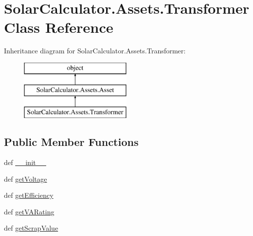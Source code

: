 \hypertarget{class_solar_calculator_1_1_assets_1_1_transformer}{\section{Solar\-Calculator.\-Assets.\-Transformer Class Reference}
\label{class_solar_calculator_1_1_assets_1_1_transformer}
}
Inheritance diagram for Solar\-Calculator.\-Assets.\-Transformer\-:\begin{figure}[H]
\begin{center}
\leavevmode
\includegraphics[height=3.000000cm]{class_solar_calculator_1_1_assets_1_1_transformer}
\end{center}
\end{figure}
\subsection*{Public Member Functions}
\begin{DoxyCompactItemize}
\item 
def \hyperlink{class_solar_calculator_1_1_assets_1_1_transformer_a05b3e8937827ed59686b570fc0c5816a}{\-\_\-\-\_\-init\-\_\-\-\_\-}
\item 
def \hyperlink{class_solar_calculator_1_1_assets_1_1_transformer_ac2d12c40284109fc43248ae90717b0fd}{get\-Voltage}
\item 
def \hyperlink{class_solar_calculator_1_1_assets_1_1_transformer_af77a85ec54070a3a91fd666cce9e4827}{get\-Efficiency}
\item 
def \hyperlink{class_solar_calculator_1_1_assets_1_1_transformer_a6be18ce9ea8d57adaffb256f0641cc47}{get\-V\-A\-Rating}
\item 
def \hyperlink{class_solar_calculator_1_1_assets_1_1_transformer_a6f9e8e42cdf85aa7caac77d1bf4ca224}{get\-Scrap\-Value}
\end{DoxyCompactItemize}
